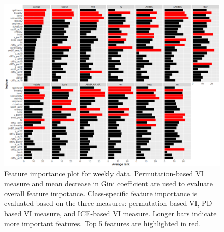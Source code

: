 \documentclass[11pt,a4paper,]{article}
\begin{document}
\begin{figure}[h]

{\centering \includegraphics{figures/viweekly-1} 

}

\caption{Feature importance plot for weekly data. Permutation-based VI measure and mean decrease in Gini coefficient are used to evaluate overall feature impotance. Class-specific feature importance is evaluated based on the three measures: permutation-based VI, PD-based VI measure, and ICE-based VI measure. Longer bars indicate more important features. Top 5 features are highlighted in red.}\label{fig:viweekly}
\end{figure}

\newpage
\end{document}
